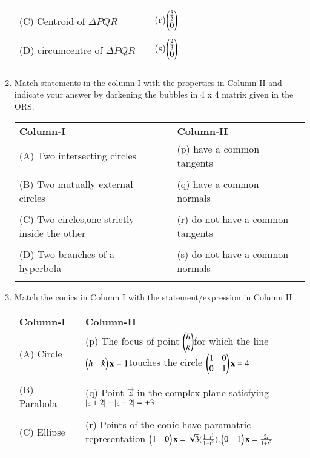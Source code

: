 \documentclass[journal,12pt,twocolumn]{IEEEtran}
\begin{document}
\begin{enumerate}[label=\arabic*]
\begin{tabular}{llll}
    &&&\\
    (C) Centroid of $\Delta PQR$&\enspace &   (r)$\begin{pmatrix}{\frac{5}{2}}\\0\end{pmatrix}$\\
    &&&\\
    (D) circumcentre of $\Delta PQR$&\enspace &   (s)$\begin{pmatrix}\frac{2}{3}\\0\end{pmatrix}$\\
    &&&\\
    \end{tabular}  
 \item Match statements in the column I with the properties in Column II and indicate your answer by darkening the bubbles in 4 x 4 matrix given in the ORS.
    \begin{tabular}{llll}
    \textbf{Column-I} &\enspace &\textbf{Column-II}\\
    (A) Two intersecting circles &\enspace &(p) have a common tangents\\
    &&&\\
    (B) Two mutually external circles &\enspace & (q) have a common normals\\
    &&&\\
    (C) Two circles,one strictly inside the other&\enspace &(r) do not have a common tangents\\ &&&\\
    (D) Two branches of a hyperbola& \enspace &(s) do not have a common normals\\&&&\\
    \end{tabular}
    \item Match the conics in Column I with the statement/expression in Column II\\
    \begin{tabular}{llll}
    \textbf{Column-I} & \enspace &\textbf{Column-II}\\
    (A) Circle &\enspace &(p) The focus of point $\begin{pmatrix}h\\k\end{pmatrix}$for which the line $\begin{pmatrix}h&k\end{pmatrix}\mathbf{x}=1$touches the circle $\begin{pmatrix}1&0\\0&1\end{pmatrix}\mathbf{x}=4$\\ &&&\\
    (B) Parabola &\enspace & (q) Point $\vec{z}$ in the complex plane satisfying $\left\vert z+2\right\vert-\left\vert z-2\right\vert=\pm3$\\&&&\\
    (C) Ellipse &\enspace &(r) Points of the conic have paramatric representation $\begin{pmatrix}1&0\end{pmatrix}\mathbf{x}=\sqrt{3}(\frac{1-t^2}{1+t^2})$,$\begin{pmatrix}0&1\end{pmatrix}\mathbf{x}=\frac{2t}{1+t^2}$ \\ &&&\\

\end{tabular}
\end{enumerate}
\end{document}
